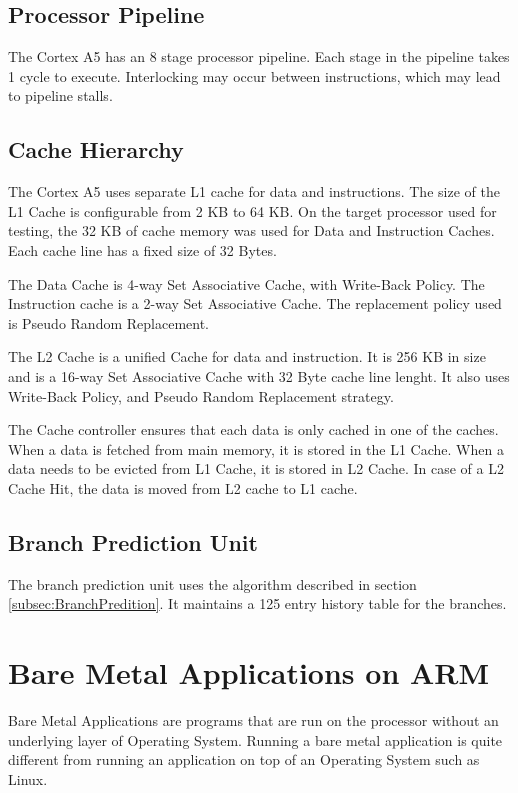 \subsection{Processor Pipeline}
The Cortex A5 has an 8 stage processor pipeline. Each stage in the pipeline takes 1 cycle to execute. Interlocking may occur between instructions, which may lead to pipeline stalls. %

\subsection{Cache Hierarchy}
The Cortex A5 uses separate L1 cache for data and instructions. The size of the L1 Cache is configurable from 2 KB to 64 KB. On the target processor used for testing, the 32 KB of cache memory was used for Data and Instruction Caches. Each cache line has a fixed size of 32 Bytes.

The Data Cache is 4-way Set Associative Cache, with Write-Back Policy. The Instruction cache is a 2-way Set Associative Cache. The replacement policy used is Pseudo Random Replacement. 

The L2 Cache is a unified Cache for data and instruction. It is 256 KB in size and is a 16-way Set Associative Cache with 32 Byte cache line lenght. It also uses Write-Back Policy, and Pseudo Random Replacement strategy. 

The Cache controller ensures that each data is only cached in one of the caches. When a data is fetched from main memory, it is stored in the L1 Cache. When a data needs to be evicted from L1 Cache, it is stored in L2 Cache. In case of a L2 Cache Hit, the data is moved from L2 cache to L1 cache.

\subsection{Branch Prediction Unit}
The branch prediction unit uses the algorithm described in section \ref{subsec:BranchPredition}. It maintains a 125 entry history table for the branches.


\section{Bare Metal Applications on ARM}
Bare Metal Applications are programs that are run on the processor without an underlying layer of Operating System. Running a bare metal application is quite different from running an application on top of an Operating System such as Linux.

